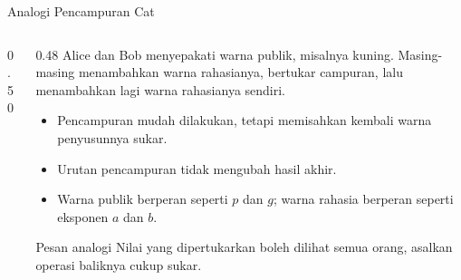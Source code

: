 \documentclass[aspectratio=169,11pt]{beamer}
\begin{document}
\begin{frame}{Analogi Pencampuran Cat}
    \begin{columns}[T,onlytextwidth]
        \begin{column}{0.50\textwidth}
            \centering
        \end{column}
        \begin{column}{0.48\textwidth}
            \footnotesize
            Alice dan Bob menyepakati warna publik, misalnya kuning.
            Masing-masing menambahkan warna rahasianya, bertukar campuran,
            lalu menambahkan lagi warna rahasianya sendiri.
            \begin{itemize}
                \item Pencampuran mudah dilakukan, tetapi memisahkan kembali
                      warna penyusunnya sukar.
                \item Urutan pencampuran tidak mengubah hasil akhir.
                \item Warna publik berperan seperti $p$ dan $g$; warna
                      rahasia berperan seperti eksponen $a$ dan $b$.
            \end{itemize}
            \begin{exampleblock}{Pesan analogi}
                \footnotesize
                Nilai yang dipertukarkan boleh dilihat semua orang, asalkan
                operasi baliknya cukup sukar.
            \end{exampleblock}
        \end{column}
    \end{columns}
\end{frame}
\end{document}
